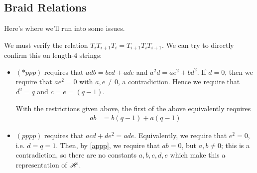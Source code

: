 \documentclass{amsart}
\begin{document}
\subsection*{Braid Relations}
Here's where we'll run into some issues.

We must verify the relation $T_iT_{i+1}T_i = T_{i+1}T_iT_{i+1}$.
We can try to directly confirm this on length-4 strings: 
\begin{itemize}
  \item $(*ppp)$ requires that $adb = bcd + ade$ and $a^2d = ae^2 + bd^2$.
    If $d = 0$, then we require that $ae^2 = 0$ with $a,e \neq 0$, a contradiction.
    Hence we require that $d^2 = q$ and $c = e = (q-1)$.

    With the restrictions given above, the first of the above equivalently requires
    \begin{align}
      ab &= b(q-1) + a(q-1)
    \label{appp}
    \end{align}

   \item $(pppp)$ requires that $acd + de^2 = ade$.
     Equivalently, we require that $e^2 = 0$, i.e. $d = q = 1$.
     Then, by \eqref{appp}, we require that $ab = 0$, but $a,b \neq 0$;
     this is a contradiction, so there are no constants $a,b,c,d,e$ which make this a representation of $\mathscr{H}$.

     \iffalse
    These together imply that $a = b$, and that $a = 2(q-1)$;
    when $q \neq \frac{1}{2}, 2$ this contradicts \eqref{ab}.
  \item $(*p*p)$ requires that $b^2c = bc^2 + ad^2$ and $abd = bcd + ade$.
    Equivalently, we require that
    \begin{align}
      b^2(d^2-1) &= b(d^2-1)^2 + ad^2 \label{bq}\\
      ab &= b(q-1) + a(q - 1).\nonumber
    \end{align}
    In particular, we have that
    \[
      bd^4 + (a - 2b - b^2)d^2 + b - b^2 = 0 = ad^4 + (b - 2a)d^2 - a^2d + a. 
    \]
    Equivalently, $d$ is a root of the polynomial $(a-b)d^4 + (3b - 3a + b^2)d^2 - a^2d + (2b + b^2)$.
    \fi

\end{itemize}
\end{document}
